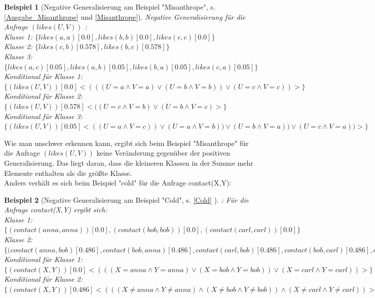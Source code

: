 \documentclass[a4paper, 11pt]{book}
\newtheorem{Bsp}{Beispiel}[section]
\begin{document}
\begin{Bsp}[Negative Generalisierung am Beispiel "{}Misanthrope"{}, s. \ref{Ausgabe_Misanthrope} und \ref{Misanthrope}]
	 Negative Generalisierung für die Anfrage  $ (likes(U,V))$ :\\
	
	\noindent
	Klasse 1: $ \{ likes(a,a)[0.0], likes(b,b)[0.0], likes(c,c)[0.0]\} $\\
	Klasse 2: $ \{likes(c,b)[0.578], likes(b,c)[0.578]\} $\\
	Klasse 3: $ \{likes(a,c)[0.05], likes(a,b)[0.05], likes(b,a)[0.05], likes(c,a)[0.05]\} $\\
	
	\noindent
	Konditional für Klasse 1: $ \{(likes(U,V))[0.0] <(((U = a \land V = a) \lor (U = b \land V = b)) \lor (U = c \land V = c)) >\} $\\
	Konditional für Klasse 2: $ \{(likes(U,V))[0.578] <((U = c \land V = b) \lor (U = b \land V = c)>\} $\\	
	Konditional für Klasse 3: $ \{(likes(U,V))[0.05] <((U = a \land V = c)) \lor (U = a \land V = b)) \lor (U = b \land V = a)) \lor (U = c \land V = a))>\} $\\
	\end{Bsp}
Wie man unschwer erkennen kann, ergibt sich beim Beispiel "{}Misanthrope"{} für die Anfrage $ (likes(U,V))$  keine Veränderung gegenüber der positiven Generalisierung. Das liegt daran, dass die kleineren Klassen in der Summe mehr Elemente enthalten als die größte Klasse.\\ 
Anders verhält es sich beim Beispiel "{}cold"{} für die Anfrage contact(X,Y):
\begin{Bsp}[Negative Generalisierung am Beispiel "{}Cold"{}, s. \ref{Cold} ]:
	Für die Anfrage contact(X,Y) ergibt sich:\\
	
	\noindent
	Klasse 1: $ \{(contact(anna,anna))[0.0], (contact(bob,bob))[0.0],(contact(carl, carl))[0.0]\} $\\
	Klasse 2: $ \{(contact(anna,bob)[0.486], contact(bob,anna)[0.486], contact(carl,bob)[0.486], contact(bob,carl)[0.486], contact(anna,carl)[0.486],contact(carl,anna)[0.486],\} $\\
	
	\noindent
	Konditional für Klasse 1: $ \{(contact(X,Y))[0.0]<(((X = anna \land Y = anna) \lor (X = bob \land Y = bob)) \lor (X = carl \land Y = carl))>\} $\\
	Konditional für Klasse 2: $ \{(contact(X,Y))[0.486]<(((X \neq anna \land Y \neq anna) \land (X \neq bob \land Y \neq bob)) \land (X \neq carl \land Y \neq carl))>\} $\\
\end{Bsp}
\end{document}

